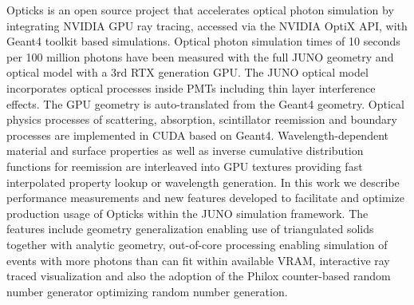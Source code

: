 Opticks is an open source project that accelerates optical photon simulation 
by integrating NVIDIA GPU ray tracing, accessed via the NVIDIA OptiX API, with
Geant4 toolkit based simulations.
Optical photon simulation times of 10 seconds per 100 million photons
have been measured with the full JUNO geometry and optical model 
with a 3rd RTX generation GPU. The JUNO optical model incorporates 
optical processes inside PMTs including thin layer interference effects. 
The GPU geometry is auto-translated from the Geant4 geometry. 
Optical physics processes of scattering, absorption, scintillator reemission 
and boundary processes are implemented in CUDA based on Geant4.  
Wavelength-dependent material and surface
properties as well as inverse cumulative distribution functions for reemission
are interleaved into GPU textures providing fast interpolated property lookup
or wavelength generation. 
In this work we describe performance measurements and new features developed 
to facilitate and optimize production usage of Opticks within the JUNO simulation framework. 
The features include geometry generalization enabling use of triangulated solids 
together with analytic geometry, out-of-core processing enabling simulation of 
events with more photons than can fit within available VRAM, interactive ray traced visualization 
and also the adoption of the Philox counter-based random number generator optimizing 
random number generation.   
